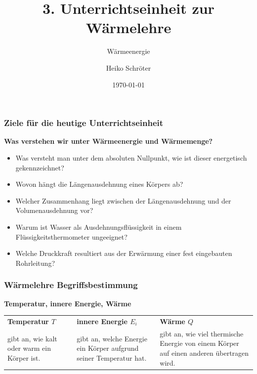 \documentclass{beamer}
\title{3. Unterrichtseinheit zur Wärmelehre}
\subtitle{Wärmeenergie}
\author{Heiko Schröter}
\date{\today}
\begin{document}
\frame{\titlepage}

\frame
{
  \frametitle{Ziele für die heutige Unterrichtseinheit}
  \textbf{Was verstehen wir unter Wärmeenergie und Wärmemenge?}
  \begin{itemize}
	\item Was versteht man unter dem absoluten Nullpunkt, wie ist dieser energetisch gekennzeichnet?
	\item Wovon hängt die Längenausdehnung eines Körpers ab?
	\item Welcher Zusammenhang liegt zwischen der Längenausdehnung und der Volumenausdehnung vor?
	\item Warum ist Wasser als Ausdehnungsflüssigkeit in einem Flüssigkeitsthermometer ungeeignet?
	\item Welche Druckkraft resultiert aus der Erwärmung einer fest eingebauten Rohrleitung?
  \end{itemize}
}

\frame
{
  \frametitle{Wärmelehre Begriffsbestimmung}
\begin{large}
  \begin{center}
  \textbf{Temperatur, innere Energie, Wärme}
  \end{center}
\end{large}
\begin{small}
  \begin{tabular}{p{2.8cm}p{3cm}p{4cm}}
  \textbf{Temperatur $T$} & \textbf{innere Energie $E_i$} & \textbf{Wärme $Q$} \\
  gibt an, wie kalt oder warm ein Körper ist. & gibt an, welche Energie ein Körper aufgrund seiner Temperatur hat. & gibt an, wie viel thermische Energie von einem Körper auf einen anderen übertragen wird. \\ 
  \end{tabular} 
\end{small}
}
\end{document}
